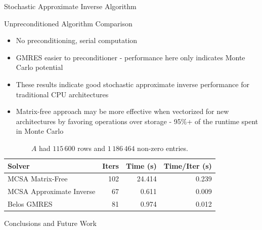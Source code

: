\documentclass{beamer}
\begin{document}
\begin{frame}{Stochastic Approximate Inverse Algorithm}
\end{frame}

\begin{frame}{Unpreconditioned Algorithm Comparison}

  \begin{itemize}
  \item No preconditioning, serial computation
  \item GMRES easier to preconditioner - performance here only indicates Monte
    Carlo potential
  \item These results indicate good stochastic approximate inverse performance
    for traditional CPU architectures
  \item Matrix-free approach may be more effective when vectorized for new
    architectures by favoring operations over storage - 95\%+ of the runtime
    spent in Monte Carlo
  \end{itemize}

    \begin{table}[htb!]
    \begin{center}
      \begin{tabular}{lrrr}
        \toprule
        \multicolumn{1}{l}{Solver} &
        \multicolumn{1}{r}{Iters} &
        \multicolumn{1}{r}{Time (s)} &
        \multicolumn{1}{r}{Time/Iter (s)}
        \\ \midrule
        MCSA Matrix-Free & 102 & 24.414 & 0.239 \\
        MCSA Approximate Inverse & 67 & 0.611 & 0.009 \\
        Belos GMRES & 81 & 0.974 & 0.012 \\
        \bottomrule
      \end{tabular}
    \end{center}
    \caption{$A$ had $115\,600$ rows and $1\,186\,464$ non-zero entries.}
  \end{table} 

\end{frame}

\begin{frame}

  \center Conclusions and Future Work
  
\end{frame}
\end{document}
